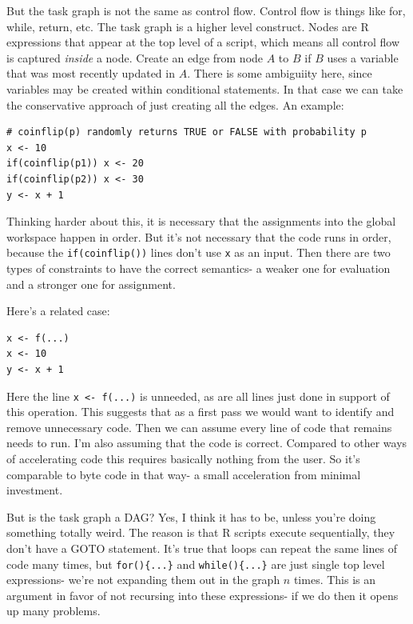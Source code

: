\documentclass[12pt]{article}
\begin{document}
But the task graph is not the same as control flow. Control flow is things
like for, while, return, etc. The task graph is a higher level construct. 
Nodes are R expressions that appear at the top level of a script, which
means all control flow is captured \emph{inside} a node. Create an edge
from node $A$ to $B$ if $B$ uses a variable that was most recently updated
in $A$. There is some ambiguiity here, since variables may be created
within conditional statements. In that case we can take the conservative
approach of just creating all the edges. An example:

\begin{verbatim}
# coinflip(p) randomly returns TRUE or FALSE with probability p
x <- 10
if(coinflip(p1)) x <- 20
if(coinflip(p2)) x <- 30
y <- x + 1
\end{verbatim}

Thinking harder about this, it is necessary that the assignments into the
global workspace happen in order. But it's not necessary that the code runs
in order, because the \texttt{if(coinflip())} lines don't use \texttt{x} as
an input. Then there are two types of constraints to have the correct
semantics- a weaker one for evaluation and a stronger one for assignment. 

Here's a related case:

\begin{verbatim}
x <- f(...)
x <- 10
y <- x + 1
\end{verbatim}

Here the line \texttt{x <- f(...)} is unneeded, as are all lines just done
in support of this operation. This suggests that as a first pass we would
want to identify and remove unnecessary code. Then we can assume every
line of code that remains needs to run. I'm also assuming that the code is
correct. Compared to other ways of accelerating code this requires
basically nothing from the user. So it's comparable to byte code in that
way- a small acceleration from minimal investment.

But is the task graph a DAG? Yes, I think it has to be, unless you're doing
something totally weird.  The reason is that R scripts execute
sequentially, they don't have a GOTO statement. It's true that loops can
repeat the same lines of code many times, but \texttt{for()\{...\}} and 
\texttt{while()\{...\}} are just single top level expressions- we're not
expanding them out in the graph $n$ times. This is an argument in favor of
not recursing into these expressions- if we do then it opens up many
problems. 
\end{document}
